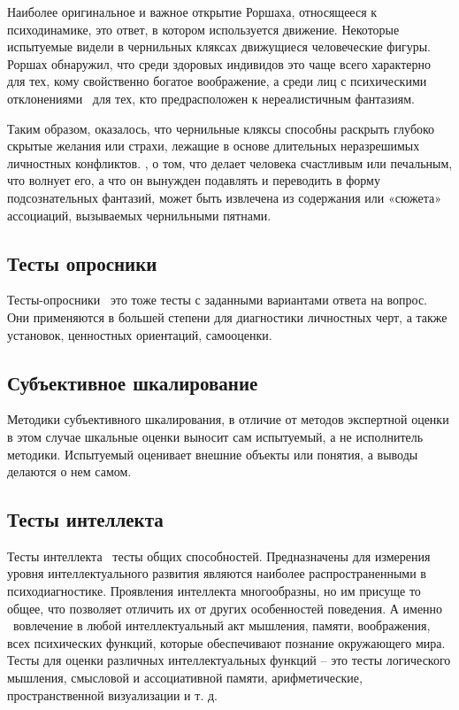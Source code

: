 Наиболее оригинальное и важное открытие Роршаха, относящееся к 
психодинамике, это ответ, в котором используется 
движение. Некоторые испытуемые видели в чернильных кляксах движущиеся 
человеческие фигуры. Роршах обнаружил, что среди здоровых индивидов 
это чаще всего характерно для тех, кому свойственно богатое 
воображение, а среди лиц с психическими отклонениями \textendash\ для тех, 
кто предрасположен к нереалистичным фантазиям. 

Таким образом, оказалось, что чернильные 
кляксы способны раскрыть глубоко скрытые желания или страхи, 
лежащие в основе длительных неразрешимых личностных конфликтов.
, о том, что делает человека счастливым или печальным, что волнует 
его, а что он вынужден подавлять и переводить в форму подсознательных 
фантазий, может быть извлечена из содержания или «сюжета» ассоциаций, 
вызываемых чернильными пятнами.

\subsection*{Тесты опросники}
Тесты-опросники \textendash\ это тоже тесты с заданными вариантами ответа на 
вопрос. Они применяются в большей степени для 
диагностики личностных черт, а также установок, ценностных 
ориентаций, самооценки.
\subsection*{Субъективное шкалирование}
Методики субъективного шкалирования, в отличие от методов экспертной 
оценки в этом случае шкальные оценки выносит сам испытуемый, а не 
исполнитель методики. Испытуемый оценивает внешние объекты или понятия, 
а выводы делаются о нем самом. 
\subsection*{Тесты интеллекта}
Тесты интеллекта \textendash\ тесты общих способностей. Предназначены для 
измерения уровня интеллектуального развития являются наиболее 
распространенными в психодиагностике. Проявления интеллекта 
многообразны, но им присуще то общее, что позволяет отличить 
их от других особенностей поведения. А именно \textendash\ вовлечение в 
любой интеллектуальный акт мышления, памяти, воображения, всех 
психических функций, которые обеспечивают познание окружающего 
мира. Тесты для оценки различных интеллектуальных функций – это 
тесты логического мышления, смысловой и ассоциативной памяти, 
арифметические, пространственной визуализации и т. д. 
